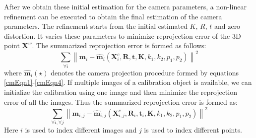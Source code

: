 \documentclass{report}
\begin{document}
After we obtain these initial estimation for the camera parameters, a non-linear refinement can be executed to obtain the final estimation of the camera parameters. The refinement starts from the initial estimated $K$, $R$, $t$ and zero distortion. It varies these parameters to minimize reprojection error of the 3D point $\mathbf{X}^w$. The summarized reprojection error is formed as follows: 
\begin{equation}
\sum_{\forall i} \left \| \mathbf{m}_i - \hat{\mathbf{m}}_i(\mathbf{X}^c_i, \mathbf{R}, \mathbf{t}, \mathbf{K}, k_1, k_2, p_1, p_2) \right \|^2
\label{dltOptEqn}
\end{equation}
where $\hat{\mathbf{m}}_i(\star)$ denotes the camera projection procedure formed by equations \ref{cmEqn1}-\ref{cmEqn4}. If multiple images of a calibration object is available, we can initialize the calibration using one image and then minimize the reprojection error of all the images. Thus the summarized reprojection error is formed as: 
\begin{equation}
\sum_{\forall i, \forall j} \left \| \mathbf{m}_{i, j} - \hat{\mathbf{m}}_{i, j} (\mathbf{X}^c_{i, j}, \mathbf{R}_i, \mathbf{t}_i, \mathbf{K}, k_1, k_2, p_1, p_2) \right \|^2
\label{dltAllOptEqn}
\end{equation}
Here $i$ is used to index different images and $j$ is used to index different points. 
\end{document}
